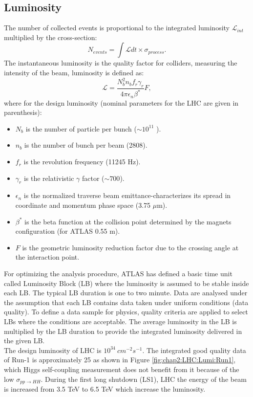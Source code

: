 \subsection{Luminosity}
\label{chap2:LHC:Lumi}
The number of collected events is proportional to the integrated luminosity $\mathcal{L}_{int}$ multiplied by the cross-section: 
\begin{equation}
N_{events} = \int\mathcal{L} dt \times \sigma_{process}.
\end{equation}
The instantaneous luminosity is the quality factor for colliders, measuring the intensity of the beam, luminosity is defined as:
\begin{equation}
\mathcal{L} = \frac{N_b^2n_bf_r\gamma_r}{4\pi\epsilon_n\beta^*}F,
\end{equation}
where for the design luminosity (nominal parameters for the LHC are given in parenthesis):
\begin{itemize}
	\item $N_b$ is the number of particle per bunch ($\sim10^{11}$ ).
	\item $n_b$ is the number of bunch per beam (2808).
	\item $f_r$ is the revolution frequency (11245 Hz).
	\item $\gamma_r$ is the relativistic $\gamma$ factor ($\sim 700$).
	\item $\epsilon_n$ is the normalized traverse beam emittance-characterizes its spread in coordinate and momentum phase space (3.75 $\mu$m).
	\item $\beta^*$ is the beta function at the collision point determined by the magnets configuration (for ATLAS 0.55 m).
	\item $F$ is the geometric luminosity reduction factor due to the crossing angle at the interaction point.
\end{itemize}
For optimizing the analysis procedure, ATLAS has defined a basic time unit called  Luminosity Block (LB) where the luminosity is assumed to be stable inside each LB. The typical LB duration is one to two minute. Data are analysed under the assumption that each LB contains data taken under uniform conditions (data quality). To define a data sample for physics, quality criteria are applied to select LBs where the conditions are acceptable. The average luminosity in the LB is multiplied by the LB duration to provide the integrated luminosity delivered in the given LB. \\
The design luminosity of LHC is $10^{34} \ cm^{-2}s^{-1}$. The integrated good quality data of Run-1 is approximately 25 \ifb as shown in Figure \ref{fig:chap2:LHC:Lumi:Run1}, which Higgs self-coupling measurement does not benefit from it because of the low $\sigma_{pp\rightarrow HH}$. During the first long shutdown (LS1), LHC the energy of the beam is increased from 3.5 TeV to 6.5 TeV which increase the luminosity. 
